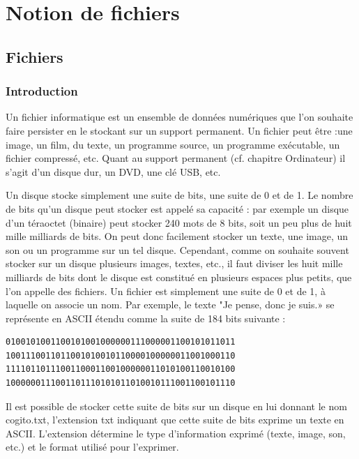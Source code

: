 \documentclass[11pt, a4paper]{book}
\begin{document}
\setcounter{chapter}{3}

\chapter{Notion de fichiers}

\section{Fichiers}
\subsection{Introduction}

Un fichier informatique est un ensemble de données numériques que l'on souhaite faire persister en le stockant sur un support permanent. Un fichier peut être :une image, un film, du texte, un programme source, un programme exécutable, un fichier compressé, etc. Quant au support permanent (cf. chapitre Ordinateur) il s'agit d'un disque dur, un DVD, une clé USB, etc.

Un disque stocke simplement une suite de bits, une suite de 0 et de 1. Le nombre de bits qu’un disque peut stocker est appelé sa capacité : par exemple un disque d’un téraoctet (binaire) peut stocker 240 mots de 8 bits, soit un peu plus de huit mille milliards de bits. On peut donc facilement stocker un texte, une image, un son ou un programme sur un tel disque. Cependant, comme on souhaite souvent stocker sur un disque plusieurs images, textes, etc., il faut diviser les huit mille milliards de bits dont le disque est constitué en plusieurs espaces plus petits, que l’on appelle des fichiers. Un fichier est simplement une suite de 0 et de 1, à laquelle on associe un nom. Par exemple, le texte "Je pense, donc je suis.» se représente en ASCII étendu comme la suite de 184 bits suivante :

\begin{verbatim}
0100101001100101001000000111000001100101011011
1001110011011001010010110000100000011001000110
1111011011100110001100100000011010100110010100
1000000111001101110101011010010111001100101110
\end{verbatim}

Il est possible de stocker cette suite de bits sur un disque en lui donnant le nom cogito.txt, l’extension txt indiquant que cette suite de bits exprime un texte en ASCII. L’extension détermine le type d’information exprimé (texte, image, son, etc.) et le format utilisé pour l’exprimer.
\end{document}
